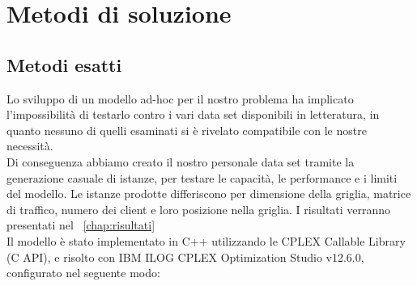  \chapter{Metodi di soluzione} \label{cap:metodi}

\ifpdf
    \graphicspath{{Chapter6/Figs/Raster/}{Chapter6/Figs/PDF/}{Chapter6/Figs/}}
\else
    \graphicspath{{Chapter6/Figs/Vector/}{Chapter6/Figs/}}
\fi

\section{Metodi esatti}
Lo sviluppo di un modello ad-hoc per il nostro problema ha implicato l'impossibilità di testarlo contro i vari data set disponibili in letteratura, in quanto nessuno di quelli esaminati si è rivelato compatibile con le nostre necessità. \\
Di conseguenza abbiamo creato il nostro personale data set tramite la generazione casuale di istanze, per testare le capacità, le performance e i limiti del modello. Le istanze prodotte differiscono per dimensione della griglia, matrice di traffico, numero dei client e loro posizione nella griglia. I risultati verranno presentati nel \chaptername\ \ref{chap:risultati} \\
Il modello è stato implementato in C++ utilizzando le CPLEX Callable Library (C API), e risolto con IBM ILOG CPLEX Optimization Studio v12.6.0, configurato nel seguente modo:

